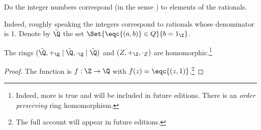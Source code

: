 

Do the integer numbers correspond (in the sense ) to elements of the rationals.


Indeed, roughly speaking the integers correspond to rationals whose denominator is 1.
Denote by $\tilde{\Q}$ the set $\Set{\eqc{(a, b)} \in Q}{b = 1_{\Z}}$.

\begin{proposition}
  The rings $(\tilde{\Q}, +_{\Q} \mid \tilde{\Q}, \cdot_{\Q} \mid \tilde{\Q})$ and $(Z, +_{\Z}, \cdot_{Z})$ are homomorphic.\footnote{Indeed, more is true and will be included in future editions. There is an \textit{order perserving} ring homomorphism.}
\end{proposition}
\begin{proof}
  The function is $f: \Z \to \Q$ with $f(z) = \eqc{(z, 1)}$.\footnote{The full account will appear in future editions.}
\end{proof}

\blankpage
